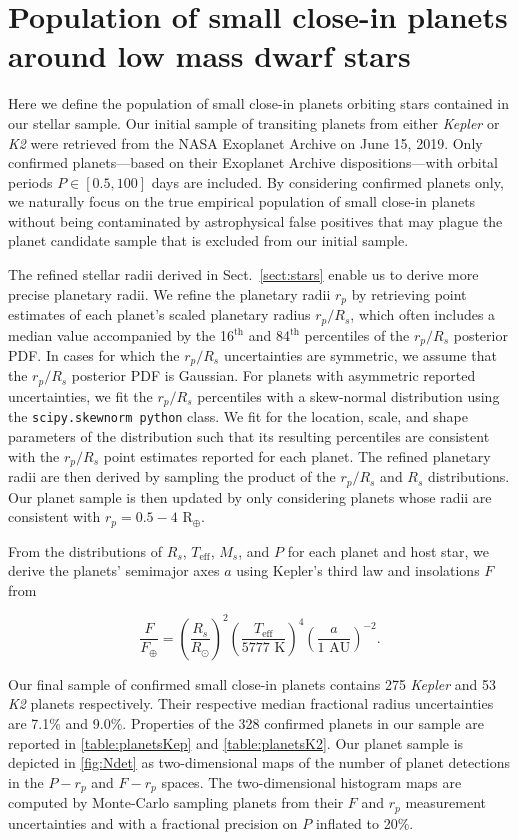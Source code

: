 \documentclass[twocolumn]{emulateapj}
\newcommand{\kepler}[1]{\emph{Kepler}#1}
\newcommand{\ktwo}[1]{\emph{K2}#1}
\newcommand{\teff}[1]{$T_{\text{eff}}$#1}
\begin{document}
\section{Population of small close-in planets around low mass dwarf stars} \label{sect:planets}
Here we define the population of small close-in planets orbiting stars contained in our stellar sample.
Our initial sample of transiting planets from either \kepler{} or \ktwo{} were retrieved from the
NASA Exoplanet Archive \citep{akeson13} on June 15, 2019. Only confirmed
planets---based on their Exoplanet Archive dispositions---with orbital periods
$P\in [0.5,100]$ days are included. By considering confirmed
planets only, we naturally focus on the true empirical population of small close-in planets
without being contaminated by astrophysical false positives that may plague the planet
candidate sample that is excluded from our initial sample.

The refined stellar radii derived in Sect.~\ref{sect:stars} enable us to derive more precise
planetary radii.
We refine the planetary radii $r_p$ by retrieving point estimates of each planet's scaled planetary radius
$r_p/R_s$, which often includes a median value 
accompanied by the 16$^{\text{th}}$ and 84$^{\text{th}}$ percentiles of the $r_p/R_s$ posterior PDF.
In cases for which the $r_p/R_s$ uncertainties
are symmetric, we assume that the $r_p/R_s$ posterior PDF is Gaussian. For planets with asymmetric reported
uncertainties, we fit the $r_p/R_s$ percentiles with a skew-normal distribution using the
\texttt{scipy.skewnorm python} class. We fit for the location, scale, and shape parameters of the
distribution such that its resulting percentiles are consistent with
the $r_p/R_s$ point estimates reported for each planet. The refined planetary radii are then derived by
sampling the product of the $r_p/R_s$ and $R_s$ distributions. Our planet sample is then updated by
only considering planets whose radii are consistent with $r_p = 0.5-4$ R$_{\oplus}$.

From the distributions of $R_s$, \teff{,} $M_s$, and $P$ for each planet and host star, we derive the planets'
semimajor axes $a$ using Kepler's third law and insolations $F$ from

\begin{equation}
  \frac{F}{F_{\oplus}} = \left( \frac{R_s}{R_{\odot}} \right)^2  \left( \frac{T_{\text{eff}}}{5777 \text{ K}} \right)^4 \left( \frac{a}{1 \text{ AU}} \right)^{-2}.
\end{equation}

Our final sample of confirmed small close-in planets 
contains 275 \kepler{} and 53 \ktwo{} planets respectively. Their respective median fractional
radius uncertainties are 7.1\% and 9.0\%. Properties of the 328 confirmed planets in our sample
are reported in \autoref{table:planetsKep} and \autoref{table:planetsK2}. Our planet sample is
depicted in \autoref{fig:Ndet} as two-dimensional maps of the number of planet detections in
the $P-r_p$ and $F-r_p$ spaces. The two-dimensional histogram maps are computed by
Monte-Carlo sampling planets from their $F$ and $r_p$
measurement uncertainties and with a fractional precision on $P$ inflated to 20\%.
\end{document}
